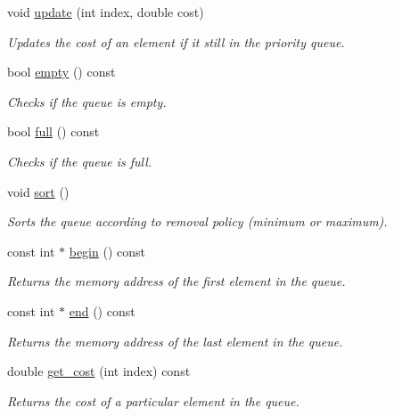 \begin{DoxyCompactItemize}
void \hyperlink{classPriorityQueue_af5033637a9c516651ee72116e0079703}{update} (int index, double cost)
\begin{DoxyCompactList}\small\item\em Updates the cost of an element if it still in the priority queue. \end{DoxyCompactList}\item 
bool \hyperlink{classPriorityQueue_aa0a8c1bed6a9f92728f93e56f3061435}{empty} () const 
\begin{DoxyCompactList}\small\item\em Checks if the queue is empty. \end{DoxyCompactList}\item 
bool \hyperlink{classPriorityQueue_abcc034a827aaec16505f9520b66f940d}{full} () const 
\begin{DoxyCompactList}\small\item\em Checks if the queue is full. \end{DoxyCompactList}\item 
void \hyperlink{classPriorityQueue_ab03659cc1374261d43252781b3cd7e66}{sort} ()
\begin{DoxyCompactList}\small\item\em Sorts the queue according to removal policy (minimum or maximum). \end{DoxyCompactList}\item 
const int $\ast$ \hyperlink{classPriorityQueue_a06ca073a126211e579a87445edf5a24f}{begin} () const 
\begin{DoxyCompactList}\small\item\em Returns the memory address of the first element in the queue. \end{DoxyCompactList}\item 
const int $\ast$ \hyperlink{classPriorityQueue_a4f9007e581cec086c48a634e07855760}{end} () const 
\begin{DoxyCompactList}\small\item\em Returns the memory address of the last element in the queue. \end{DoxyCompactList}\item 
double \hyperlink{classPriorityQueue_a3fefe82b020315a169e3ad4771450973}{get\+\_\+cost} (int index) const 
\begin{DoxyCompactList}\small\item\em Returns the cost of a particular element in the queue. \end{DoxyCompactList}\end{DoxyCompactItemize}


